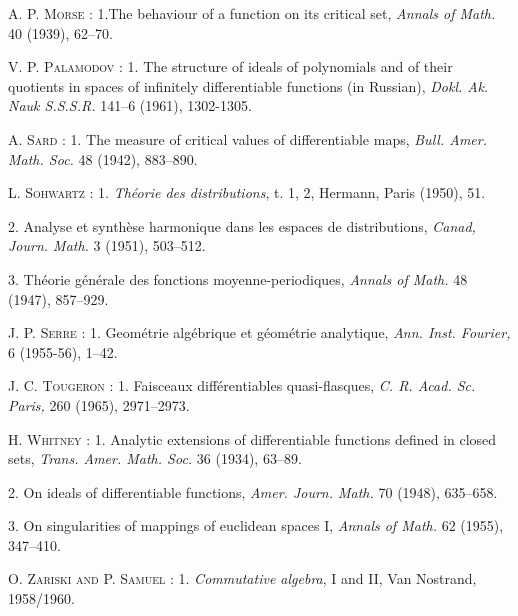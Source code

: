 \begin{thebibliography}{99}
 \textsc{A. P. Morse} : 1.\pageoriginale The behaviour of a function on its critical set, {\em Annals of Math.} 40 (1939), 62--70.

 \textsc{V. P. Palamodov} : 1. The structure of ideals of polynomials and of their quotients in spaces of infinitely differentiable functions (in Russian), {\em Dokl. Ak. Nauk S.S.S.R.} 141--6 (1961), 1302-1305.

 \textsc{A. Sard} : 1. The measure of critical values of differentiable maps, {\em Bull. Amer. Math. Soc.} 48 (1942), 883--890.

 \textsc{L. Sohwartz} : 1. {\em Th\'eorie des distributions}, t. 1, 2, Hermann, Paris (1950), 51.

 2. Analyse et synth\`ese harmonique dans les espaces de distributions, {\em Canad, Journ. Math.} 3 (1951), 503--512.

 3. Th\'eorie g\'en\'erale des fonctions moyenne-periodiques, {\em Annals of Math.} 48 (1947), 857--929.

 \textsc{J. P. Serre} : 1. G\;eom\'etrie alg\'ebrique et g\'eom\'etrie analytique, {\em Ann. Inst. Fourier,} 6 (1955-56), 1--42.

 \textsc{J. C. Tougeron} : 1. Faisceaux diff\'erentiables quasi-flasques, {\em C. R. Acad. Sc. Paris,} 260 (1965), 2971--2973.

 \textsc{H. Whitney} : 1. Analytic extensions of differentiable functions defined in closed sets, {\em Trans. Amer. Math. Soc.} 36 (1934), 63--89. 

 2. On ideals of differentiable functions, {\em Amer. Journ. Math.} 70 (1948), 635--658.

 3. On singularities of mappings of euclidean spaces I, {\em Annals of Math.} 62 (1955), 347--410.

 \textsc{O. Zariski and P. Samuel} : 1. {\em Commutative algebra}, I and II, Van Nostrand, 1958/1960.
\end{thebibliography}

\newpage

~\phantom{a}
\thispagestyle{empty}

\vfill

